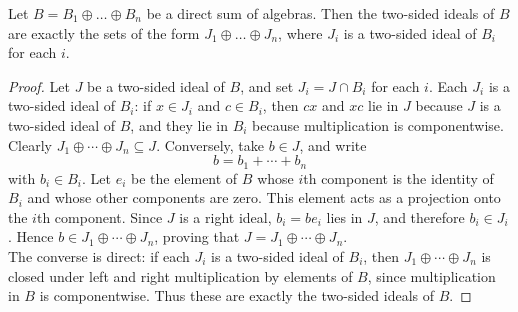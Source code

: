 \documentclass[../Odyssey_Project.tex]{subfiles}
\begin{document}
\begin{lemma}
\label{lem:13.9}
Let $B = B_1 \oplus \dots \oplus B_n$ be a direct sum of algebras. Then the two-sided ideals of $B$ are exactly the sets of the form $J_1 \oplus \dots \oplus J_n$, where $J_i$ is a two-sided ideal of $B_i$ for each $i$.
\end{lemma}
\begin{proof}
    Let $J$ be a two-sided ideal of $B$, and set $J_i = J \cap B_i$ for each $i$. Each $J_i$ is a two-sided ideal of $B_i$: if $x \in J_i$ and $c \in B_i$, then $cx$ and $xc$ lie in $J$ because $J$ is a two-sided ideal of $B$, and they lie in $B_i$ because multiplication is componentwise. Clearly $J_1 \oplus \cdots \oplus J_n \subseteq J$. Conversely, take $b \in J$, and write
    \[
        b = b_1 + \cdots + b_n
    \]
    with $b_i \in B_i$. Let $e_i$ be the element of $B$ whose $i$th component is the identity of $B_i$ and whose other components are zero. This element acts as a projection onto the $i$th component. Since $J$ is a right ideal, $b_i = be_i$ lies in $J$, and therefore $b_i \in J_i$. Hence $b \in J_1 \oplus \cdots \oplus J_n$, proving that $J = J_1 \oplus \cdots \oplus J_n$.\\
    The converse is direct: if each $J_i$ is a two-sided ideal of $B_i$, then $J_1 \oplus \cdots \oplus J_n$ is closed under left and right multiplication by elements of $B$, since multiplication in $B$ is componentwise. Thus these are exactly the two-sided ideals of $B$.
\end{proof}
\end{document}
